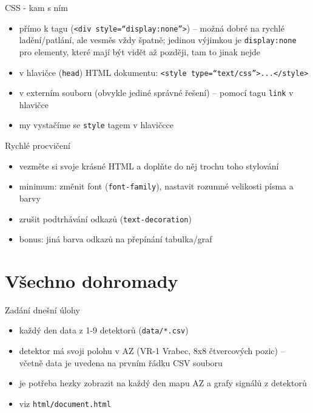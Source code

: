 \documentclass{beamer}
\begin{document}
\begin{frame}{CSS - kam s ním}
  \begin{itemize}
    \item přímo k tagu (\texttt{<div style=``display:none''>}) -- možná dobré na rychlé ladění/patlání, ale vesměs vždy špatně; jedinou výjimkou je \texttt{display:none} pro elementy, které mají být vidět až později, tam to jinak nejde
    \item v hlavičce (\texttt{head}) HTML dokumentu: \texttt{<style type=``text/css''>...</style>}
    \item v externím souboru (obvykle jediné správné řešení) -- pomocí tagu \texttt{link} v hlavičce
    \item my vystačíme se \texttt{style} tagem v hlavičcce
  \end{itemize}
\end{frame}

\begin{frame}{Rychlé procvičení}
  \begin{itemize}
    \item vezměte si svoje krásné HTML a doplňte do něj trochu toho stylování
    \item minimum: změnit font (\texttt{font-family}), nastavit rozumné velikosti písma a barvy
    \item zrušit podtrhávání odkazů (\texttt{text-decoration})
    \item bonus: jiná barva odkazů na přepínání tabulka/graf
  \end{itemize}
\end{frame}


\section{Všechno dohromady}

\begin{frame}{Zadání dnešní úlohy}
  \begin{itemize}
    \item každý den data z 1-9 detektorů (\texttt{data/*.csv})
    \item detektor má svoji polohu v AZ (VR-1 Vrabec, 8x8 čtvercových pozic) -- včetně data je uvedena na prvním řádku CSV souboru
    \item je potřeba hezky zobrazit na každý den mapu AZ a grafy signálů z detektorů
    \item viz \texttt{html/document.html}
  \end{itemize}
\end{frame}
\end{document}

